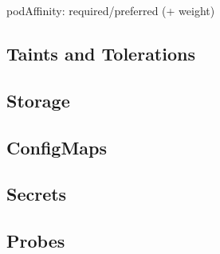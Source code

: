 podAffinity: required/preferred (+ weight)

\subsection{Taints and Tolerations}

\subsection{Storage}

\subsection{ConfigMaps}

\subsection{Secrets}

\subsection{Probes}

